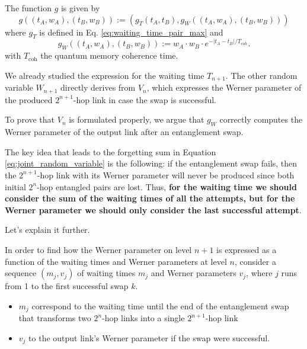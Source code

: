 \documentclass{masterthesis}
\begin{document}
The function $g$ is given by
\begin{equation}
    g\left((t_A, w_A),(t_B, w_B)\right) := \left(g_T(t_A, t_B), g_W\left((t_A, w_A),(t_B, w_B)\right)\right)
\end{equation}
where $g_T$ is defined in Eq. \ref{eq:waiting_time_pair_max} and
\begin{equation}
    g_W\left((t_A, w_A),(t_B, w_B)\right) := w_A \cdot w_B \cdot e^{-\left|t_{A}-t_{B}\right| / T_{coh}} .
\end{equation}
with $T_{\text{coh}}$ the quantum memory coherence time.

We already studied the expression for the waiting time $T_{n+1}$. The other random variable $W_{n+1}$ directly derives from $V_{n}$, which expresses the Werner parameter of the produced $2^{n+1}$-hop link in case the swap is successful.

To prove that $V_{n}$ is formulated properly, we argue that $g_{W}$ correctly computes the Werner parameter of the output link after an entanglement swap.

The key idea that leads to the forgetting sum in Equation \ref{eq:joint_random_variable} is the following: if the entanglement swap fails, then the $2^{n+1}$-hop link with its Werner parameter will never be produced since both initial $2^{n}$-hop entangled pairs are lost. Thus, \textbf{for the waiting time we should consider the sum of the waiting times of all the attempts, but for the Werner parameter we should only consider the last successful attempt}.

Let's explain it further.

In order to find how the Werner parameter on level $n+1$ is expressed as a function of the waiting times and Werner parameters at level $n$, consider a sequence $\left(m_{j}, v_{j}\right)$ of waiting times $m_{j}$ and Werner parameters $v_{j}$, where $j$ runs from 1 to the first successful swap $k$. 
\begin{itemize}
    \item $m_{j}$ correspond to the waiting time until the end of the entanglement swap that transforms two $2^{n}$-hop links into a single $2^{n+1}$-hop link
    \item $v_{j}$ to the output link's Werner parameter if the swap were successful. 
\end{itemize}
\end{document}
